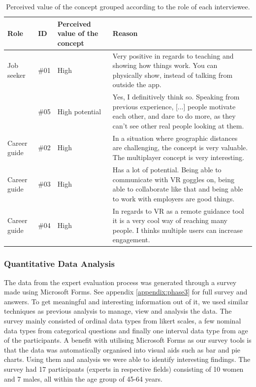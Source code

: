 \begin{table}[H]
      \centering
        \begin{tabular}{llp{2.5cm}p{5cm}}
        \toprule
        Role & ID & Perceived value of the concept & Reason\\
        \midrule\vspace{0.2cm}
         Job seeker  & \#01 & High & Very positive in regards to teaching and showing how things work. You can physically show, instead of talking from outside the app.\\
         & \#05  & High potential & Yes, I definitively think so. Speaking from previous experience, [...] people motivate each other, and dare to do more, as they can't see other real people looking at them.
         \\\midrule \vspace{0.2cm}
        Career guide & \#02  & High & In a situation where geographic distances are challenging, the concept is very valuable. The multiplayer concept is very interesting.\\ \vspace{0.2cm}
        Career guide & \#03  & High & Has a lot of potential. Being able to communicate with VR goggles on, being able to collaborate like that and being able to work with employers are good things. \\ 
        Career guide & \#04  & High & In regards to VR as a remote guidance tool it is a very cool way of reaching many people. I thinks multiple users can increase engagement. \\
        \bottomrule
        \end{tabular}
        \caption{Perceived value of the concept grouped according to the role of each interviewee.}
        \label{table:phase3SatisfactionAnalysis}
\end{table}



\subsubsection{Quantitative Data Analysis}
The data from the expert evaluation process was generated through a survey made using Microsoft Forms. See appendix \ref{appendix:phase3} for full survey and answers. To get meaningful and interesting information out of it, we used similar techniques as previous analysis to manage, view and analysis the data. The survey mainly consisted of ordinal data types from likert scales, a few nominal data types from categorical questions and finally one interval data type from age of the participants.  
A benefit with utilising Microsoft Forms as our survey tools is that the data was automatically organised into visual aids such as bar and pie charts. Using them and analysis we were able to identify interesting findings. 
The survey had 17 participants (experts in respective fields) consisting of 10 women and 7 males, all within the age group  of 45-64 years. 


